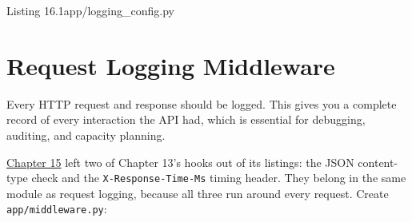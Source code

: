 \begin{codeboxcap}{\textcolor{accent}{Listing 16.1}\enspace app/logging\_config.py}
\begin{Shaded}
\begin{Highlighting}[]
\OperatorTok{=}\NormalTok{)}
        \NormalTok{,}
 \NormalTok{,}
\NormalTok{    )}
\end{Highlighting}
\end{Shaded}

\end{codeboxcap}

\setcounter{section}{3}
\section{Request Logging Middleware}\label{16-logging-error-handling:164-request-logging-middleware}

Every HTTP request and response should be logged. This gives you a complete record of every interaction the API had, which is essential for debugging, auditing, and capacity planning.

\hyperref[ch:15-structuring-the-application]{Chapter 15} left two of Chapter 13's hooks out of its listings: the JSON content-type check and the \texttt{X-Response-Time-Ms} timing header. They belong in the same module as request logging, because all three run around every request. Create \texttt{app/middleware.py}:

